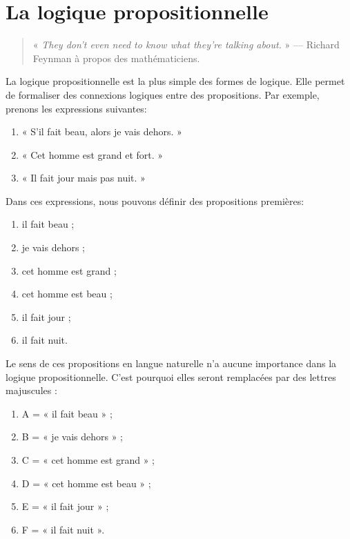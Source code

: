 
\chapter{La logique propositionnelle}

\begin{quote}
« \textit{\foreignlanguage{english}{They don't even need to know what they're
talking about.}} » --- Richard Feynman à propos des mathématiciens.
\end{quote}

La logique propositionnelle est la plus simple des formes de logique. Elle
permet de formaliser des connexions logiques entre des propositions.
Par exemple, prenons les expressions suivantes:

\begin{enumerate}
\item « S’il fait beau, alors je vais dehors. »
\item « Cet homme est grand et fort. »
\item « Il fait jour mais pas nuit. »
\end{enumerate}

Dans ces expressions, nous pouvons définir des propositions premières:

\begin{enumerate}
\item il fait beau ;
\item je vais dehors ;
\item cet homme est grand ;
\item cet homme est beau ;
\item il fait jour ;
\item il fait nuit.
\end{enumerate}

Le sens de ces propositions en langue naturelle n'a aucune importance
dans la logique propositionnelle. C'est
pourquoi elles seront remplacées par des lettres majuscules :

\begin{enumerate}
\item A = « il fait beau » ;
\item B = « je vais dehors » ;
\item C = « cet homme est grand » ;
\item D = « cet homme est beau » ;
\item E = « il fait jour » ;
\item F = « il fait nuit ».
\end{enumerate}

